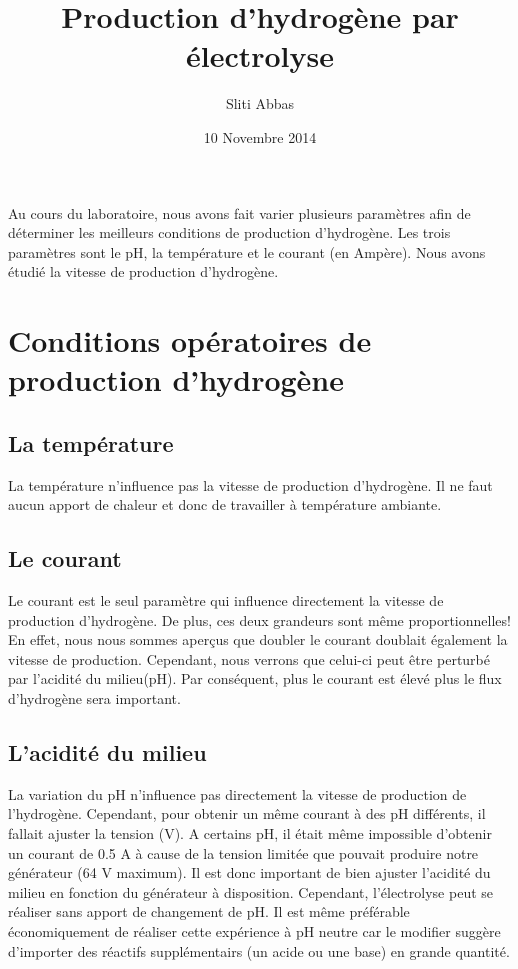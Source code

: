 \documentclass[10pt,a4paper]{article}
\title{Production d'hydrogène par électrolyse}
\author{Sliti Abbas}
\date{10 Novembre 2014}
\begin{document}
\maketitle



Au cours du laboratoire, nous avons fait varier plusieurs paramètres afin de déterminer les meilleurs conditions de production d'hydrogène. Les trois paramètres sont le pH, la température et le courant (en Ampère). Nous avons étudié la vitesse de production d'hydrogène.

\section{Conditions opératoires de production d'hydrogène}

\subsection{La température}

La température n'influence pas la vitesse de production d'hydrogène. Il ne faut aucun apport de chaleur et donc de travailler à température ambiante.



\subsection{Le courant}

Le courant est le seul paramètre qui influence directement la vitesse de production d'hydrogène. De plus, ces deux grandeurs sont même proportionnelles! En effet, nous nous sommes aperçus que doubler le courant doublait également la vitesse de production. Cependant, nous verrons que celui-ci peut être perturbé par l'acidité du milieu(pH). Par conséquent, plus le courant est élevé plus le flux d'hydrogène sera important.


\subsection{L'acidité du milieu}

La variation du pH n'influence pas directement la vitesse de production de l'hydrogène. Cependant, pour obtenir un même courant à des pH différents, il fallait ajuster la tension (V). A certains pH, il était même impossible d'obtenir un courant de 0.5 A à cause de la tension limitée que pouvait produire notre générateur (64 V maximum). Il est donc important de bien ajuster l'acidité du milieu en fonction du générateur à disposition. Cependant, l'électrolyse peut se réaliser sans apport de changement de pH. Il est même préférable économiquement de réaliser cette expérience à pH neutre car le modifier suggère d'importer des réactifs supplémentairs (un acide ou une base) en grande quantité. 
\end{document}
